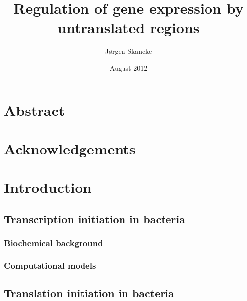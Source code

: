 \documentclass[]{ntnuthesis}
\title{Regulation of gene expression by untranslated regions}
\author{J\o rgen Skancke}
\date{August 2012}
\begin{document}
 

\frontmatter

\maketitle
\chapter*{Abstract}
\begin{quotation}
\noindent
	
\end{quotation}
\clearpage


\chapter*{Acknowledgements}


\tableofcontents

\mainmatter

\chapter{Introduction}



\section{Transcription initiation in bacteria}
\subsection{Biochemical background}

\subsection{Computational models}

\printbibliography

\section{Translation initiation in bacteria}

\printbibliography
\end{document}
